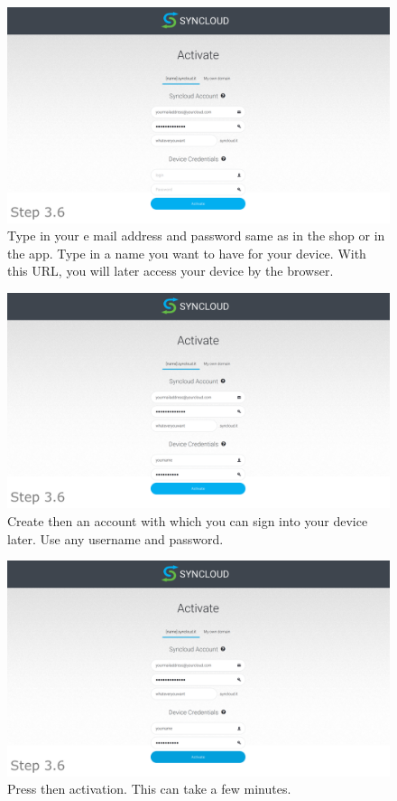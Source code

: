 \documentclass[a4paper,12pt]{article}
\begin{document}
\begin{figure}[htbp!]
	\centering
	\includegraphics[width=0.7\linewidth]{../frames/33.png}
	\caption{Type in your e mail address and password same as in the shop or in the app. Type in a name you want to have for your device. With this URL, you will later access your device by the browser.}
	\label{fig:21}
\end{figure}

\begin{figure}[htbp!]
	\centering
	\includegraphics[width=0.7\linewidth]{../frames/34.png}
	\caption{Create then an account with which you can sign into your device later. Use any username and password.}
	\label{fig:22}
\end{figure}

\begin{figure}[htbp!]
	\centering
	\includegraphics[width=0.7\linewidth]{../frames/35.png}
	\caption{Press then activation. This can take a few minutes.}
	\label{fig:23}
\end{figure}
\end{document}
